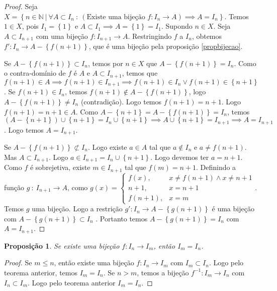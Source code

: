 \documentclass{article}
\theoremstyle{plain}
\newtheorem{prop}{Proposição}[section]
\theoremstyle{definition}
\theoremstyle{remark}
\begin{document}
\begin{proof}
	Seja $X = \left\{n \in \mathbb{N} \: | \: \forall A \subset I_n \: : \: (\text{Existe uma bijeção } f:  I_n \to A ) \implies A = I_n \right\}$. Temos $1\in X$, pois  $I_1 = \left\{1\right\}$ e $A\subset I_1 \implies A = \left\{1\right\}  = I_1$. Supondo $n\in X$.  Seja $A\subset I_{n+1}$ com uma bijeção $f:I_{n+1} \to A$. Restringindo $f$ a $I_n$, obtemos $f': I_n \to A-\left\{f(n+1)\right\}$, que é uma bijeção pela proposição \ref{propbijecao}.

	Se $A - \left\{f(n+1) \right\} \subset I_n$, temos por $n\in X$ que $A-\left\{f(n+1)\right\} = I_n$. Como o contra-domínio de $f$ é $A$ e $A\subset I_{n+1}$, temos que $f(n+1)\in A \implies f(n+1) \in I_{n+1} \implies f(n+1) \in I_n \lor f(n+1)\in \left\{n+1\right\} $. Se $f(n+1) \in I_n$, temos $f(n+1)\not \in A-\left\{f(n+1)\right\}$, logo $A - \left\{ f(n+1) \right\} \neq I_n$ (contradição). Logo temos $f(n+1) = n+1$. Logo $ f(n+1) = n+1 \in A$. Como $ A - \left\{ n+1\right\} = A -\left\{ f(n+1) \right\}  = I_n$, temos $ (A - \left\{ n+1\right\}) \cup \left\{n+1\right\} =   I_n\cup\left\{n+1\right\} \implies A\cup \left\{n+1\right\} = I_{n+1} \implies A = I_{n+1}$. Logo temos $A = I_{n+1}$.


	Se $A - \left\{f(n+1)\right\} \not \subset I_n$. Logo existe $a\in A$ tal que $a\not \in I_n$ e $a\neq f(n+1)$. Mas $A\subset I_{n+1}$. Logo $a\in I_{n+1} = I_n \cup \left\{n+1\right\}$. Logo devemos ter $a  =n+1$. Como $f$ é sobrejetiva, existe $m\in I_{n+1}$ tal que $f(m) = n+1$. Definindo a função $g \: : \: I_{n+1} \to A$, como $g(x) = \begin{cases}
		f(x), &x\neq f(n+1) \land x \neq n+1\\
		n+1, &x = n+1 \\
		f(n+1), &x = m
	\end{cases}$. Temos $g$ uma bijeção. Logo a restrição $g': I_n \to A-\left\{g(n+1) \right\}$ é uma bijeção com $A - \left\{g(n+1) \right\} \subset I_n$ . Portanto temos $A - \left\{g(n+1)\right\} = I_n$ com $A = I_{n+1}$. 
\end{proof}
\begin{prop}
	Se existe uma bijeção $f: I_n \to I_m$, então $I_m = I_n$.
\end{prop}
\begin{proof}
	Se $m\leq n$, então existe uma bijeção $f:I_n \to I_m$ com $I_m \subset I_n$. Logo pelo teorema anterior, temos $I_m = I_n$. Se $n > m$, temos a bijeção $f^{-1}: I_m \to I_n$ com $I_n \subset I_m$. Logo pelo teorema anterior $I_m = I_n$.
\end{proof}
\end{document}
